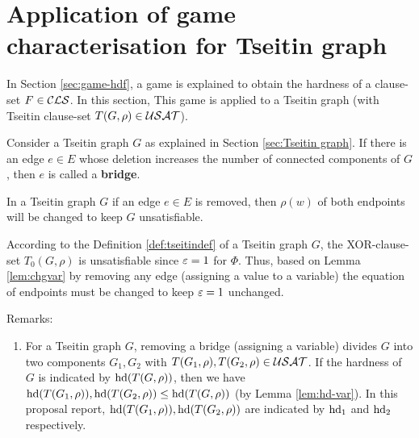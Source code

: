 \documentclass{report}
\begin{document}
\section{Application of game characterisation for Tseitin graph}
\label{sec:appgame}

In Section \ref{sec:game-hdf}, a game is explained to obtain the hardness of a clause-set $F \in \mathcal{CLS}$. In this section, This game is applied to a Tseitin graph (with Tseitin clause-set $T(G,\rho) \in \mathcal{USAT}$). %

 
\begin{defi}\label{def:bridge}
Consider a Tseitin graph $G$ as explained in Section \ref{sec:Tseitin graph}. If there is an edge $e \in E$ whose deletion increases the number of connected components of $G$, then $e$ is called a \textbf{bridge}.
\end{defi} 

\begin{lem}\label{lem:game3}
In a Tseitin graph $G$ if an edge $e \in E$ is removed, then $\rho(w)$ of both endpoints will be changed to keep $G$ unsatisfiable. 
\end{lem}
\begin{prf}
According to the Definition \ref{def:tseitindef} of a Tseitin graph $G$, the XOR-clause-set $T_0(G,\rho)$ is unsatisfiable since $\varepsilon=1$ for $\Phi$. Thus, based on Lemma \ref{lem:chgvar} by removing any edge (assigning a value to a variable) the equation of endpoints must be changed to keep $\varepsilon=1$ unchanged.
\end{prf}
Remarks:
  \begin{enumerate}
  \item For a Tseitin graph $G$, removing a bridge (assigning a variable) divides $G$ into two components $G_1,G_2 $ with $T(G_1,\rho), T(G_2,\rho) \in \mathcal{USAT}$. If the hardness of $G$ is indicated by $\operatorname{hd}(T(G,\rho))$, then we have $\operatorname{hd}(T(G_1,\rho)), \operatorname{hd}(T(G_2,\rho)) \le \operatorname{hd}(T(G,\rho)) $ (by Lemma \ref{lem:hd-var}). In this proposal  report,  $\operatorname{hd}(T(G_1,\rho)), \operatorname{hd}(T(G_2,\rho))$ are indicated by  $\operatorname{hd}_1$ and $\operatorname{hd}_2$ respectively.
\end{enumerate}
\end{document}

